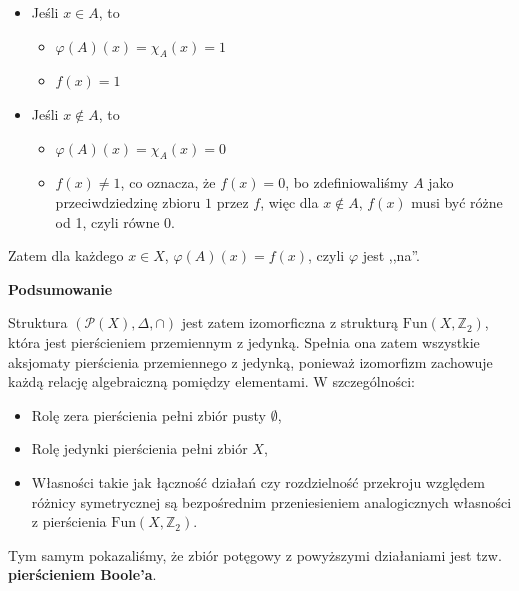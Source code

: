 \begin{solution}
\begin{enumerate}[label=\alph*)]
\begin{enumerate}[label=\arabic*)]
				\begin{itemize}
					\item Jeśli $x \in A$, to
						\begin{itemize}
							 \item $\varphi \left( A \right) \left( x \right) = \chi_{A}(x) = 1 $
							\item $f\left( x \right) = 1$ 
						\end{itemize}
					\item Jeśli $x \not\in A$, to
						\begin{itemize}
							\item $\varphi \left( A \right) \left( x \right) = \chi_{A}\left( x \right) = 0 $
							\item $f\left( x \right) \neq 1$, co oznacza, że $f\left( x \right) = 0$, bo zdefiniowaliśmy $A$ jako przeciwdziedzinę zbioru ${1}$ przez  $f$, więc dla $x \not\in A $,  $f\left( x \right)$ musi być różne od 1, czyli równe 0.
						\end{itemize}
				\end{itemize}
				Zatem dla każdego $x \in X$, $\varphi \left( A \right) \left( x \right) = f\left( x \right)  $, czyli $\varphi$ jest ,,na''.

			\end{enumerate}
			
	\noindent \textbf{Podsumowanie}

	Struktura $\left( \mathcal{P}(X) , \Delta , \cap  \right) $ jest zatem izomorficzna z strukturą $\text{Fun}\left( X, \mathbb{Z}_{2} \right) $, która jest pierścieniem przemiennym z jedynką. Spełnia ona zatem wszystkie aksjomaty pierścienia przemiennego z jedynką, ponieważ izomorfizm zachowuje każdą relację algebraiczną pomiędzy elementami. W szczególności:
	\begin{itemize}
		\item Rolę zera pierścienia pełni zbiór pusty $\emptyset $,
		\item Rolę jedynki pierścienia pełni zbiór $X$,
		\item Własności takie jak łączność działań czy rozdzielność przekroju względem różnicy symetrycznej są bezpośrednim przeniesieniem analogicznych własności z pierścienia $\text{Fun}\left( X, \mathbb{Z}_{2} \right) $.
	\end{itemize}

	Tym samym pokazaliśmy, że zbiór potęgowy z powyższymi działaniami jest tzw. \textbf{pierścieniem Boole'a}. 
	\end{enumerate}
\end{solution} 
